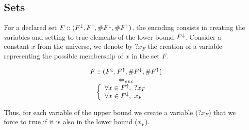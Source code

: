 \documentclass[3p,authoryear,times]{elsarticle}
\newcommand{\MS}[1]{{{#1}^{\uparrow}}}
\newcommand{\ms}[1]{{\MakeUppercase{#1}^\downarrow}}
\newcommand{\MSF}[0]{\MS{F}}
\newcommand{\msF}[0]{\ms{f}}
\newcommand{\msFb}[0]{{F^{?}}}
\newcommand{\MC}[1]{{\#{#1}^\uparrow{}}}
\newcommand{\mc}[1]{{\#{#1}^\downarrow}}
\newcommand{\MCF}[0]{\MC{F}{}}
\newcommand{\mcF}[0]{\mc{F}{}}
\newcommand{\cf}[0]{{F}}
\newcommand{\xcf}[0]{x_{\cf}}
\newcommand{\enc}[0]{\Leftrightarrow_{enc}}
\newcommand{\ucs}[0]{{\rm{ ~unit~clauses}}}
\newcommand{\bcs}[0]{{\rm{ ~binary~clauses}}}
\newcommand{\fa}[0]{\forall}
\newcommand{\setD}[6]{
\ensuremath{
\begin{array}{ll}
\forall x \in {\cal U} &
%
  \left \{
      \begin{array}{lll}
      x \in \msF &	#1 ~~& \ifthenelse{\equal{#2}{0}}{}{|D_{v} \cap \msF|~ {#2}}\\
      x \in \msFb &	#3  ~~& \ifthenelse{\equal{#4}{0}}{}{|\msFb|~ {#4}}\\
      x \not \in \MSF &	#5    ~~& \ifthenelse{\equal{#6}{0}}{}{|D_{v} \setminus \MSF|~ {#6}}\\
      \end{array}
      \right. \\
\end{array}
} 
}
\begin{document}
\color{red}
\subsection{Sets}
For a declared set $F::( \msF, \MSF,\mcF, \MCF)$, the encoding consists in creating the variables and setting to true elements of the lower bound $\msF$. Consider a constant $x$ from the universe, we denote by $?\xcf$ the creation of a variable representing the possible membership of $x$ in the set $F$. 
 
\[
\begin{array}{c}
F::( \msF, \MSF,\mcF, \MCF)  \\
 \enc \\
\left \lbrace 
\begin{array}{l@{~~~~} l}
\fa x \in \MSF,~ ?\xcf \\
\fa x \in \msF ,~ \xcf \\
\end{array}
\right.
\end{array}
\]

Thus, for each variable of the upper bound we create a variable ($?\xcf$) that we force to true if it is also in the lower bound ($\xcf$).



\end{document}
